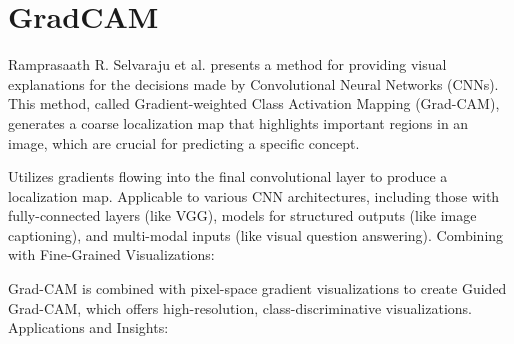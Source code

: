 




\section{GradCAM}
Ramprasaath R. Selvaraju et al. presents a method for providing visual explanations for the decisions made by Convolutional Neural Networks (CNNs). This method, called Gradient-weighted Class Activation Mapping (Grad-CAM), generates a coarse localization map that highlights important regions in an image, which are crucial for predicting a specific concept.

Utilizes gradients flowing into the final convolutional layer to produce a localization map.
Applicable to various CNN architectures, including those with fully-connected layers (like VGG), models for structured outputs (like image captioning), and multi-modal inputs (like visual question answering).
Combining with Fine-Grained Visualizations:

Grad-CAM is combined with pixel-space gradient visualizations to create Guided Grad-CAM, which offers high-resolution, class-discriminative visualizations.
Applications and Insights:

